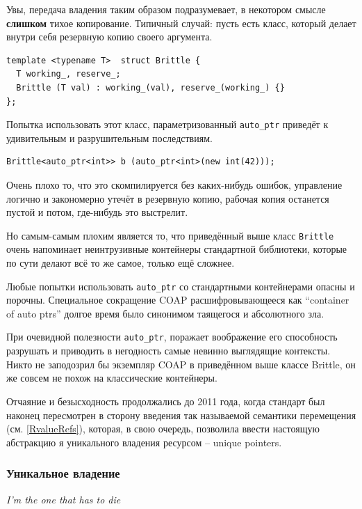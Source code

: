 \documentclass[a4paper,12pt,oneside]{article}
\begin{document}
Увы, передача владения таким образом подразумевает, в некотором смысле \textbf{слишком} тихое копирование. Типичный случай: пусть есть класс, который делает внутри себя резервную копию своего аргумента.

\begin{lstlisting}
template <typename T>  struct Brittle {
  T working_, reserve_;
  Brittle (T val) : working_(val), reserve_(working_) {}
};
\end{lstlisting}

Попытка использовать этот класс, параметризованный \lstinline!auto_ptr! приведёт к удивительным и разрушительным последствиям.

\begin{lstlisting}
Brittle<auto_ptr<int>> b (auto_ptr<int>(new int(42)));
\end{lstlisting}

Очень плохо то, что это скомпилируется без каких-нибудь ошибок, управление логично и закономерно утечёт в резервную копию, рабочая копия останется пустой и потом, где-нибудь это выстрелит.

Но самым-самым плохим является то, что приведённый выше класс \lstinline!Brittle! очень напоминает неинтрузивные контейнеры стандартной библиотеки, которые по сути делают всё то же самое, только ещё сложнее.

Любые попытки использовать \lstinline!auto_ptr! со стандартными контейнерами опасны и порочны. Специальное сокращение COAP расшифровывающееся как ``container of auto ptrs'' долгое время было синонимом таящегося и абсолютного зла.

При очевидной полезности \lstinline!auto_ptr!, поражает воображение его способность разрушать и приводить в негодность самые невинно выглядящие контексты. Никто не заподозрил бы экземпляр COAP в приведённом выше классе Brittle, он же совсем не похож на классические контейнеры.

Отчаяние и безысходность продолжались до 2011 года, когда стандарт был наконец пересмотрен в сторону введения так называемой семантики перемещения (см. \ref{RvalueRefs}), которая, в свою очередь, позволила ввести настоящую абстракцию я уникального владения ресурсом -- unique pointers.

\subsubsection{Уникальное владение}\label{subsub:uniqueptrs}

\hfill\textit{I'm the one that has to die}
\end{document}
